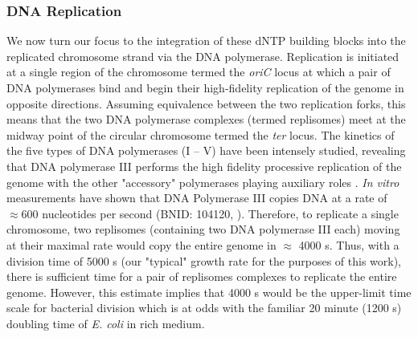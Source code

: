 \subsubsection{DNA Replication}
We now turn our focus to the integration of
these dNTP building blocks into the replicated chromosome strand via the DNA
polymerase. Replication is initiated at a
single region of the chromosome termed the \textit{oriC} locus at which a pair
of DNA polymerases bind and begin their high-fidelity replication of the genome
in opposite directions. Assuming equivalence between the two replication forks,
this means that the two DNA polymerase complexes (termed replisomes) meet at the
midway point of the circular chromosome termed the \textit{ter} locus. The
kinetics of the five types of DNA polymerases (I -- V) have been intensely
studied, revealing that DNA polymerase III performs the high fidelity processive
replication of the genome with the other "accessory" polymerases playing
auxiliary roles \citep{fijalkowska2012}. \textit{In vitro} measurements have
shown that DNA Polymerase III copies DNA at a rate of $\approx 600$ nucleotides
per second (BNID: 104120, \cite{milo2010}). Therefore, to replicate a single
chromosome, two replisomes (containing two DNA polymerase III each) moving at their maximal rate would copy the
entire genome in $\approx$ 4000 s. Thus, with a division time of 5000 s (our
"typical" growth rate for the purposes of this work), there is sufficient time
for a pair of replisomes complexes to replicate the entire genome.
However, this estimate implies that 4000 s would be the upper-limit time scale
for bacterial division which is at odds with the familiar 20 minute (1200 s)
doubling time of \textit{E. coli} in rich medium.


